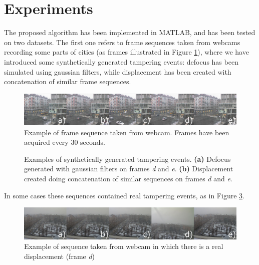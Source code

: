 \documentclass{llncs}
\begin{document}
\section{Experiments}\label{sec:experiments}
The proposed algorithm has been implemented in MATLAB, and has been tested on two datasets.
The first one refers to frame sequences taken from webcams recording some parts of cities (as frames illustrated in Figure \ref{fig:buenosAires}), where we have introduced some synthetically generated tampering events:
defocus has been simulated using gaussian filters, while displacement has been created with concatenation of similar frame sequences.
\begin{figure}
	\centering
	\includegraphics[width=1\linewidth]{Immagini/buenosAires}
	\caption{Example of frame sequence taken from webcam. Frames have been acquired every $30$ seconds.}
	\label{fig:buenosAires}
\end{figure}
\begin{figure}
\centering
{}
\caption{Examples of synthetically generated tampering events. \textbf{(a)} Defocus generated with gaussian filters on frames \textit{d} and \textit{e}. \textbf{(b)} Displacement created doing concatenation of similar sequences on frames \textit{d} and \textit{e}.}
\label{fig:buenosAiresTamp}
\end{figure}
In some cases these sequences contained real tampering events, as in Figure \ref{fig:fulvioTestiDispl}.\\
\begin{figure}
\centering
\includegraphics[width=1\linewidth]{Immagini/fulvioTestiDispl}
\caption{Example of sequence taken from webcam in which there is a real displacement (frame \textit{d})}
\label{fig:fulvioTestiDispl}
\end{figure}
\end{document}
